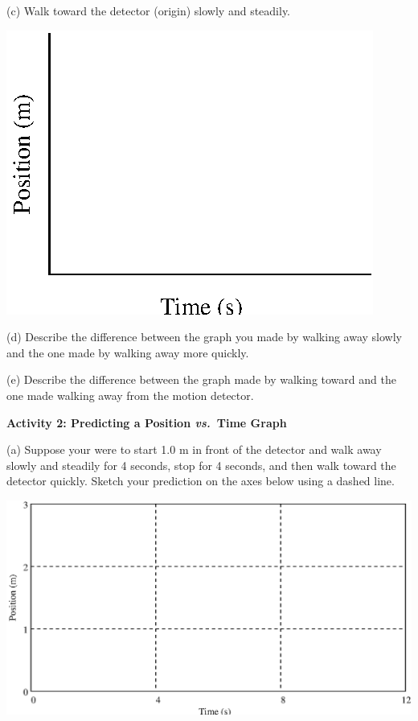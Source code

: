 \pagebreak[2]
(c) Walk toward the detector (origin) slowly and steadily.

\vspace{0.3cm}
{\par\centering \includegraphics{position/position_fig1.eps} \par}
\vspace{0.3cm}

(d) Describe the difference between the graph you made by walking away slowly
and the one made by walking away more quickly.
\answerspace{20mm}

(e) Describe the difference between the graph made by walking toward and the
one made walking away from the motion detector.
\answerspace{20mm}

\textbf{Activity 2: Predicting a Position \textit{vs.}~Time Graph} 

(a) Suppose your were to start 1.0 m in front of the detector and walk away
slowly and steadily for 4 seconds, stop for 4 seconds, and then walk toward
the detector quickly. Sketch your prediction on the axes below using a dashed
line.

\vspace{0.3cm}
{\par\centering \includegraphics{position/position_fig2.eps} \par}
\vspace{0.3cm}

